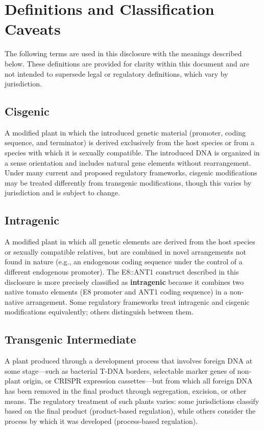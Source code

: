 \documentclass[12pt,a4paper]{article}
\begin{document}
\section{Definitions and Classification Caveats}
\label{sec:definitions}

The following terms are used in this disclosure with the meanings described below. These definitions are provided for clarity within this document and are not intended to supersede legal or regulatory definitions, which vary by jurisdiction.

\subsection{Cisgenic}
A modified plant in which the introduced genetic material (promoter, coding sequence, and terminator) is derived exclusively from the host species or from a species with which it is sexually compatible. The introduced DNA is organized in a sense orientation and includes natural gene elements without rearrangement. Under many current and proposed regulatory frameworks, cisgenic modifications may be treated differently from transgenic modifications, though this varies by jurisdiction and is subject to change.

\subsection{Intragenic}
A modified plant in which all genetic elements are derived from the host species or sexually compatible relatives, but are combined in novel arrangements not found in nature (e.g., an endogenous coding sequence under the control of a different endogenous promoter). The E8::ANT1 construct described in this disclosure is more precisely classified as \textbf{intragenic} because it combines two native tomato elements (E8 promoter and ANT1 coding sequence) in a non-native arrangement. Some regulatory frameworks treat intragenic and cisgenic modifications equivalently; others distinguish between them.

\subsection{Transgenic Intermediate}
A plant produced through a development process that involves foreign DNA at some stage---such as bacterial T-DNA borders, selectable marker genes of non-plant origin, or CRISPR expression cassettes---but from which all foreign DNA has been removed in the final product through segregation, excision, or other means. The regulatory treatment of such plants varies: some jurisdictions classify based on the final product (product-based regulation), while others consider the process by which it was developed (process-based regulation).
\end{document}
